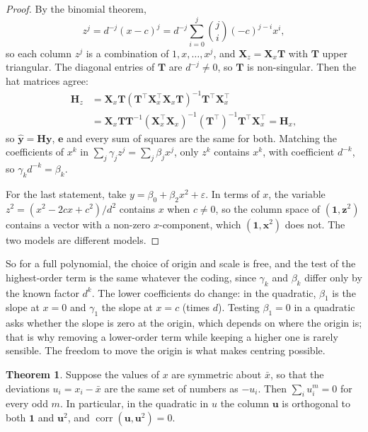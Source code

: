 \documentclass[11pt,a4paper]{article}
\numberwithin{equation}{section}
\theoremstyle{definition}
\newtheorem{thm}{Theorem}[subsection]
\begin{document}
\begin{proof}
By the binomial theorem,
\[
z^j = d^{-j}(x - c)^j = d^{-j}\sum_{i=0}^j \binom{j}{i}(-c)^{j-i}x^i ,
\]
so each column $z^j$ is a combination of $1, x, \dots, x^j$, and $\mathbf{X}_z = \mathbf{X}_x\mathbf{T}$ with $\mathbf{T}$ upper triangular. The
diagonal entries of $\mathbf{T}$ are $d^{-j} \ne 0$, so $\mathbf{T}$ is non-singular. Then the hat matrices agree:
\begin{align*}
\mathbf{H}_z &= \mathbf{X}_x\mathbf{T}(\mathbf{T}^\top\mathbf{X}_x^\top\mathbf{X}_x\mathbf{T})^{-1}\mathbf{T}^\top\mathbf{X}_x^\top \\
&= \mathbf{X}_x\mathbf{T}\mathbf{T}^{-1}(\mathbf{X}_x^\top\mathbf{X}_x)^{-1}(\mathbf{T}^\top)^{-1}\mathbf{T}^\top\mathbf{X}_x^\top = \mathbf{H}_x ,
\end{align*}
so $\hat{\mathbf{y}} = \mathbf{Hy}$, $\mathbf{e}$ and every sum of squares are the same for both.
Matching the coefficients of $x^k$ in $\sum_j\gamma_jz^j = \sum_j\beta_jx^j$, only $z^k$ contains $x^k$, with coefficient
$d^{-k}$, so $\gamma_kd^{-k} = \beta_k$.

For the last statement, take $y = \beta_0 + \beta_2x^2 + \varepsilon$. In terms of $x$, the variable $z^2 = (x^2 - 2cx + c^2)/d^2$
contains $x$ when $c \ne 0$, so the column space of $(\mathbf{1}, \mathbf{z}^2)$ contains a vector with a non-zero $x$-component,
which $(\mathbf{1}, \mathbf{x}^2)$ does not. The two models are different models.
\end{proof}

So for a full polynomial, the choice of origin and scale is free, and the test of the highest-order term is the
same whatever the coding, since $\gamma_k$ and $\beta_k$ differ only by the known factor $d^k$. The lower coefficients do change: in the
quadratic, $\beta_1$ is the slope at $x = 0$ and $\gamma_1$ the slope at $x = c$ (times $d$). Testing $\beta_1 = 0$ in a quadratic
asks whether the slope is zero at the origin, which depends on where the origin is; that is why
removing a lower-order term while keeping a higher one is rarely sensible. The freedom to move the origin
is what makes centring possible.

\begin{thm}\label{thm:centred-poly}
Suppose the values of $x$ are symmetric about $\bar x$, so that the deviations $u_i = x_i - \bar x$ are the same
set of numbers as $-u_i$. Then $\sum_i u_i^m = 0$ for every odd $m$. In particular, in the quadratic in $u$
the column $\mathbf{u}$ is orthogonal to both $\mathbf{1}$ and $\mathbf{u}^2$, and $\operatorname{corr}(\mathbf{u}, \mathbf{u}^2) = 0$.
\end{thm}
\end{document}

